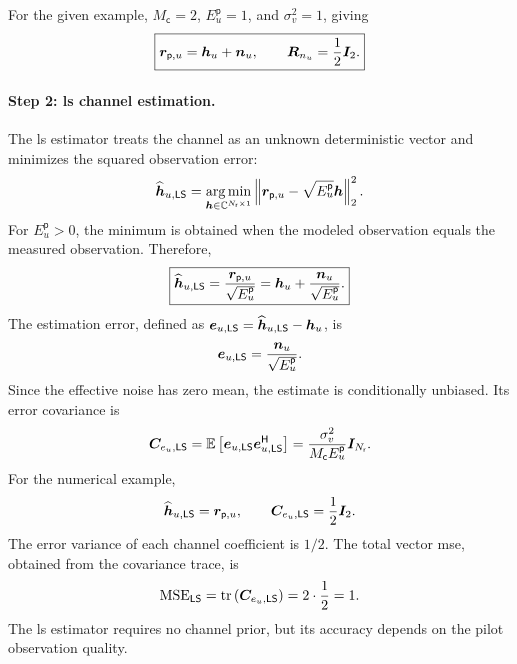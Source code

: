 For the given example, $M_{\mathsf c}=2$, $E_u^{\mathsf p}=1$, and $\sigma_v^2=1$, giving
\begin{equation}
	\boxed{
		\bm{r}_{\mathsf p,u}=\bm{h}_u+\bm{n}_u,
		\qquad
		\bm{R}_{n_u}=\frac12\bm{I}_2.
	}
	\label{eq06:pilot-numerical}
\end{equation}

\paragraph{Step 2: \ac{ls} channel estimation.}
The \ac{ls} estimator treats the channel as an unknown deterministic vector and minimizes the squared observation error:
\begin{equation*}
	\widehat{\bm{h}}_{u,\mathsf{LS}}
	=\operatorname*{arg\,min}_{\bm{h}\in\mathbb{C}^{N_{\mathsf{r}}\times1}}
	\left\|\bm{r}_{\mathsf p,u}-\sqrt{E_u^{\mathsf p}}\bm{h}\right\|_2^2.
\end{equation*}
For $E_u^{\mathsf p}>0$, the minimum is obtained when the modeled observation equals the measured observation. Therefore,
\begin{equation}
	\boxed{
		\widehat{\bm{h}}_{u,\mathsf{LS}}
		=\frac{\bm{r}_{\mathsf p,u}}{\sqrt{E_u^{\mathsf p}}}
		=\bm{h}_u+\frac{\bm{n}_u}{\sqrt{E_u^{\mathsf p}}}.
	}
	\label{eq06:pilot-ls}
\end{equation}
The estimation error, defined as $\bm{e}_{u,\mathsf{LS}}=\widehat{\bm{h}}_{u,\mathsf{LS}}-\bm{h}_u$, is
\begin{equation*}
	\bm{e}_{u,\mathsf{LS}}=\frac{\bm{n}_u}{\sqrt{E_u^{\mathsf p}}}.
\end{equation*}
Since the effective noise has zero mean, the estimate is conditionally unbiased. Its error covariance is
\begin{equation}
	\bm{C}_{e_u,\mathsf{LS}}
	=\mathbb{E}\left[\bm{e}_{u,\mathsf{LS}}{\bm{e}}^{\mathsf{H}}_{u,\mathsf{LS}}\right]
	=\frac{\sigma_v^2}{M_{\mathsf c}E_u^{\mathsf p}}\bm{I}_{N_{\mathsf{r}}}.
	\label{eq06:pilot-ls-error}
\end{equation}
For the numerical example,
\begin{equation*}
	\widehat{\bm{h}}_{u,\mathsf{LS}}=\bm{r}_{\mathsf p,u},
	\qquad
	\bm{C}_{e_u,\mathsf{LS}}=\frac12\bm{I}_2.
\end{equation*}
The error variance of each channel coefficient is $1/2$. The total vector \ac{mse}, obtained from the covariance trace, is
\begin{equation*}
	\mathrm{MSE}_{\mathsf{LS}}
	=\operatorname{tr}\left(\bm{C}_{e_u,\mathsf{LS}}\right)
	=2\cdot\frac12=1.
\end{equation*}
The \ac{ls} estimator requires no channel prior, but its accuracy depends on the pilot observation quality.

